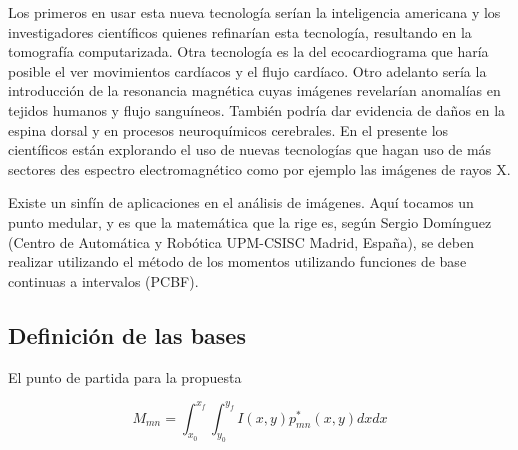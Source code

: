 \documentclass[b5paper, 11pt]{book}
\newcommand{\0}{\mathbf{0}}
\theoremstyle{estiloB}
\theoremstyle{estiloC}
\theoremstyle{estiloD}
\begin{document}
Los primeros en usar esta nueva tecnología serían la inteligencia americana y los investigadores científicos quienes refinarían esta tecnología, resultando en la tomografía computarizada. Otra tecnología es la del ecocardiograma que haría posible el ver movimientos cardíacos y el flujo cardíaco. Otro adelanto sería la introducción de la resonancia magnética cuyas imágenes revelarían anomalías en tejidos humanos y flujo sanguíneos. También podría dar evidencia de daños en la espina dorsal y en procesos neuroquímicos cerebrales. En el presente los científicos están explorando el uso de nuevas tecnologías que hagan uso de más sectores des espectro electromagnético como por ejemplo las imágenes de rayos X.

Existe un sinfín de aplicaciones en el análisis de imágenes. Aquí tocamos un punto medular, y es que la matemática que la rige es, según Sergio Domínguez (Centro de Automática y Robótica UPM-CSISC Madrid, España),  se deben realizar utilizando el método de los momentos utilizando funciones de base continuas a intervalos (PCBF).

\subsection{Definición de las bases}

El punto de partida para la propuesta

\[
M_{mn}= \int_{x_0}^{x_f} \int_{y_0}^{y_f} I(x,y)p_{mn}^{*} (x,y) dx dx
\]
\end{document}
